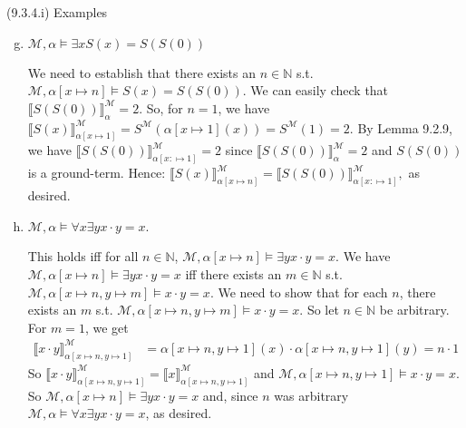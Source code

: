\begin{frame}{(9.3.4.i) Examples}

		{\small\begin{enumerate}[(a)]
			
				
				\setcounter{enumi}{6}
				
				\item $\mathcal{M},\alpha\vDash \exists x S(x)=S(S(0))$
				
				We need to establish that there exists an $n\in\mathbb{N}$ s.t.  $\mathcal{M},\alpha[x\mapsto n]\vDash S(x)=S(S(0))$. We can easily check that $\llbracket S(S(0))\rrbracket_\alpha^\mathcal{M}=2$. So, for $n=1$, we have $\llbracket S(x)\rrbracket^\mathcal{M}_{\alpha[x\mapsto 1]}=S^\mathcal{M}(\alpha[x\mapsto 1](x))=S^\mathcal{M}(1)=2$. By Lemma 9.2.9, we have $\llbracket S(S(0))\rrbracket_{\alpha[x:\mapsto1]}^\mathcal{M}=2$ since $\llbracket S(S(0))\rrbracket_\alpha^\mathcal{M}=2$ and $S(S(0))$ is a ground-term. Hence: $\llbracket S(x)\rrbracket^\mathcal{M}_{\alpha[x\mapsto n]}=\llbracket S(S(0))\rrbracket_{\alpha[x:\mapsto1]}^\mathcal{M},$ as desired.			
				
				\item $\mathcal{M},\alpha\vDash \forall x\exists y x\cdot y=x$.
				
			This holds iff for all $n\in\mathbb{N}$, $\mathcal{M},\alpha[x\mapsto n]\vDash \exists y x\cdot y=x$. We have $\mathcal{M},\alpha[x\mapsto n]\vDash \exists y x\cdot y=x$ iff there exists an $m\in\mathbb{N}$ s.t. $\mathcal{M},\alpha[x\mapsto n, y\mapsto m]\vDash x\cdot y=x$. We need to show that for each $n$, there exists an $m$ s.t. $\mathcal{M},\alpha[x\mapsto n, y\mapsto m]\vDash x\cdot y=x$. So let $n\in\mathbb{N}$ be arbitrary. For $m=1$, we get 
				\begin{align*}
				\llbracket x\cdot y\rrbracket^\mathcal{M}_{\alpha[x\mapsto n, y\mapsto 1]}&=\alpha[x\mapsto n, y\mapsto 1](x)\cdot \alpha[x\mapsto n, y\mapsto 1](y)=n\cdot 1
				\end{align*}
			So $\llbracket x\cdot y\rrbracket^\mathcal{M}_{\alpha[x\mapsto n, y\mapsto 1]}=\llbracket x\rrbracket^\mathcal{M}_{\alpha[x\mapsto n, y\mapsto 1]}$ and  $\mathcal{M},\alpha[x\mapsto n, y\mapsto 1]\vDash x\cdot y=x$. So $\mathcal{M},\alpha[x\mapsto n]\vDash \exists y x\cdot y=x$ and, since $n$ was arbitrary $\mathcal{M},\alpha\vDash \forall x \exists y x\cdot y=x$, as desired.
				
			\end{enumerate}}
	

\end{frame}

